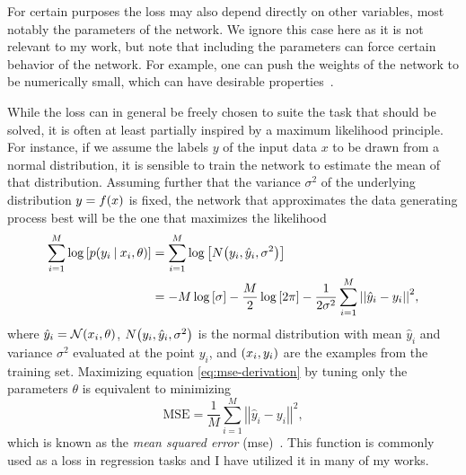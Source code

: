 For certain purposes the loss may also depend directly on other variables, most notably the parameters of the network. We ignore this case here as it is not relevant to my work, but note that including the parameters can force certain behavior of the network. For example, one can push the weights of the network to be numerically small, which can have desirable properties~\cite{Goodfellow:2016:DNN}.

While the loss can in general be freely chosen to suite the task that should be solved, it is often at least partially inspired by a maximum likelihood principle. For instance, if we assume the labels $y$ of the input data $x$ to be drawn from a normal distribution, it is sensible to train the network to estimate the mean of that distribution. Assuming further that the variance $\sigma^2$ of the underlying distribution $y=f{\left( x \right)}$ is fixed, the network that approximates the data generating process best will be the one that maximizes the likelihood
\begin{align}\label{eq:mse-derivation}
\sum_{i=1}^M\log\left[p{\left( y_i\:\vert\: x_i, \theta \right)}\right] & = \sum_{i=1}^M\log\left[N{\left( y_i, \hat{y}_i, \sigma^2 \right)}\right]\nonumber\\
& = -M\log\left[\sigma\right] - \frac{M}{2}\log\left[2\pi\right] - \frac{1}{2\sigma^2}\sum_{i=1}^M{\left|\left|\hat{y}_i - y_i\right|\right|}^2,
\end{align}
where $\hat{y}_i = \mathcal{N}{\left( x_i, \theta \right)}$, $N{\left( y_i, \hat{y}_i, \sigma^2 \right)}$ is the normal distribution with mean $\hat{y}_i$ and variance $\sigma^2$ evaluated at the point $y_i$, and ${\left( x_i, y_i \right)}$ are the examples from the training set. Maximizing equation \eqref{eq:mse-derivation} by tuning only the parameters $\theta$ is equivalent to minimizing
\begin{equation}
\text{MSE} = \frac{1}{M}\sum_{i=1}^M {\left|\left|\hat{y}_i - y_i\right|\right|}^2,
\end{equation}
which is known as the \emph{mean squared error} (\acrshort{mse})~\cite{Goodfellow:2016:DNN}. %
This function is commonly used as a loss in regression tasks and I have utilized it in many of my works.

